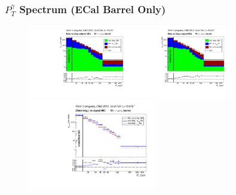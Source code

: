 \begin{frame}\frametitle{\footnotesize{$P_T^{\gamma}$ Spectrum (ECal Barrel Only)}}
   \begin{figure}[htb]
    \begin{center}
       \includegraphics[width=0.40\textwidth]{../figs/figs_v11/MUON_WGamma/PrepareYields/c_DATAvsBkgPlusSigMCc_MUON_WGamma_TEMPL_CHISO_UNblind__Barrel__phoEt.pdf}\includegraphics[width=0.40\textwidth]{../figs/figs_v11/MUON_WGamma/PrepareYields/c_DATAvsBkgPlusSigMCc_MUON_WGamma_TEMPL_SIHIH_UNblind__Barrel__phoEt.pdf}\\
       \includegraphics[width=0.50\textwidth]{../figs/figs_v11/MUON_WGamma/PrepareYields/c_BkgSubtrDATAvsSIGMC_c_MUON_WGamma__UNblind__Barrel__phoEt.pdf}\\
    \end{center}
  \end{figure}
\end{frame}%


